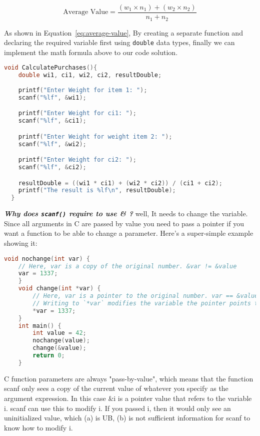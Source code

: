 \documentclass{article}
\begin{document}
  \begin{equation}
  \text{Average Value} = \frac{(w_1 \times n_1) + (w_2 \times n_2)}{n_1 + n_2}
  \label{eq:average-value}
  \end{equation}

  \vspace{2pt}
  
  As shown in Equation~\ref{eq:average-value}, By creating a separate function and declaring the required variable first using \texttt{double} data types, finally we can implement the math formula above
  to our code solution.
  \begin{lstlisting}[language=C, caption=Code Solution]
  void CalculatePurchases(){
    double wi1, ci1, wi2, ci2, resultDouble;
    
    printf("Enter Weight for item 1: ");
    scanf("%lf", &wi1);

    printf("Enter Weight for ci1: ");
    scanf("%lf", &ci1);

    printf("Enter Weight for weight item 2: ");
    scanf("%lf", &wi2);

    printf("Enter Weight for ci2: ");
    scanf("%lf", &ci2);

    resultDouble = ((wi1 * ci1) + (wi2 * ci2)) / (ci1 + ci2);
    printf("The result is %lf\n", resultDouble);
  } 
  \end{lstlisting}
  
  \textbf{\textit{Why does \texttt{scanf()} require to use \& ?}} well, It needs to change the variable. Since all arguments in C are passed by value you need to pass a pointer if you want a function to be able to change a parameter.
  Here's a super-simple example showing it:

  \begin{lstlisting}[language=C, caption=scanf example]
    void nochange(int var) {
    // Here, var is a copy of the original number. &var != &value
    var = 1337;
    }
    void change(int *var) {
        // Here, var is a pointer to the original number. var == &value
        // Writing to `*var` modifies the variable the pointer points to
        *var = 1337;
    }
    int main() {
        int value = 42;
        nochange(value);
        change(&value);
        return 0;
    }
  \end{lstlisting}
  
  C function parameters are always "pass-by-value", which means that the function scanf only sees a copy of the current value of whatever you specify as the argument expression.
  In this case \&i is a pointer value that refers to the variable i. scanf can use this to modify i. If you passed i, then it would only see an uninitialized value, which (a) is UB, (b) is not sufficient information for scanf to know how to modify i.
\end{document}
